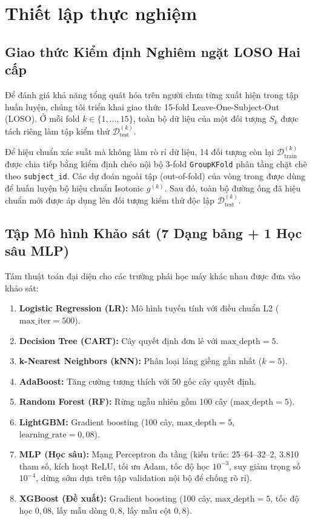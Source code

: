 \documentclass[conference]{IEEEtran}
\begin{document}
\section{Thiết lập thực nghiệm}

\subsection{Giao thức Kiểm định Nghiêm ngặt LOSO Hai cấp}
Để đánh giá khả năng tổng quát hóa trên người chưa từng xuất hiện trong tập huấn luyện, chúng tôi triển khai giao thức 15-fold Leave-One-Subject-Out (LOSO). Ở mỗi fold $k \in \{1, \dots, 15\}$, toàn bộ dữ liệu của một đối tượng $S_k$ được tách riêng làm tập kiểm thử $\mathcal{D}_{\text{test}}^{(k)}$.

Để hiệu chuẩn xác suất mà không làm rò rỉ dữ liệu, 14 đối tượng còn lại $\mathcal{D}_{\text{train}}^{(k)}$ được chia tiếp bằng kiểm định chéo nội bộ 3-fold \texttt{GroupKFold} phân tầng chặt chẽ theo \texttt{subject\_id}. Các dự đoán ngoài tập (out-of-fold) của vòng trong được dùng để huấn luyện bộ hiệu chuẩn Isotonic $g^{(k)}$. Sau đó, toàn bộ đường ống đã hiệu chuẩn mới được áp dụng lên đối tượng kiểm thử độc lập $\mathcal{D}_{\text{test}}^{(k)}$.

\subsection{Tập Mô hình Khảo sát (7 Dạng bảng + 1 Học sâu MLP)}
Tám thuật toán đại diện cho các trường phái học máy khác nhau được đưa vào khảo sát:
\begin{enumerate}
    \item \textbf{Logistic Regression (LR):} Mô hình tuyến tính với điều chuẩn L2 ($\text{max\_iter}=500$).
    \item \textbf{Decision Tree (CART):} Cây quyết định đơn lẻ với $\text{max\_depth}=5$.
    \item \textbf{k-Nearest Neighbors (kNN):} Phân loại láng giềng gần nhất ($k=5$).
    \item \textbf{AdaBoost:} Tăng cường tương thích với 50 gốc cây quyết định.
    \item \textbf{Random Forest (RF):} Rừng ngẫu nhiên gồm 100 cây ($\text{max\_depth}=5$).
    \item \textbf{LightGBM:} Gradient boosting (100 cây, $\text{max\_depth}=5$, $\text{learning\_rate}=0,08$).
    \item \textbf{MLP (Học sâu):} Mạng Perceptron đa tầng (kiến trúc: 25--64--32--2, 3.810 tham số, kích hoạt ReLU, tối ưu Adam, tốc độ học $10^{-3}$, suy giảm trọng số $10^{-4}$, dừng sớm dựa trên tập validation nội bộ để chống rò rỉ).
    \item \textbf{XGBoost (Đề xuất):} Gradient boosting (100 cây, $\text{max\_depth}=5$, tốc độ học $0,08$, lấy mẫu dòng $0,8$, lấy mẫu cột $0,8$).
\end{enumerate}
\end{document}
